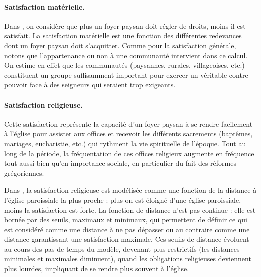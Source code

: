 \paragraph{Satisfaction matérielle.}

\begin{tcolorbox}[breakable,left=0pt,right=0pt,top=0pt,bottom=0pt,
	colback=gray!15,colframe=gray!15,width=\dimexpr\textwidth\relax, 
	enlarge left by=0mm, boxsep=5pt,arc=0pt,outer arc=0pt]
Dans \simfeodal{}, on considère que plus un foyer paysan doit régler de droits, moins il est satisfait.
La satisfaction matérielle est une fonction des différentes redevances dont un foyer paysan doit s'acquitter.
Comme pour la satisfaction générale, notons que l'appartenance ou non à une communauté intervient dans ce calcul.
On estime en effet que les communautés (paysannes, rurales, villageoises, etc.) constituent un groupe suffisamment important pour exercer un véritable contre-pouvoir face à des seigneurs qui seraient trop exigeants.
\end{tcolorbox}

\paragraph{Satisfaction religieuse.}
Cette satisfaction représente la capacité d'un foyer paysan à se rendre facilement à l'église pour assister aux offices et recevoir les différents sacrements (baptêmes, mariages, eucharistie, etc.) qui rythment la vie spirituelle de l'époque.
Tout au long de la période, la fréquentation de ces offices religieux augmente en fréquence tout aussi bien qu'en importance sociale, en particulier du fait des réformes grégoriennes.

\begin{tcolorbox}[breakable,left=0pt,right=0pt,top=0pt,bottom=0pt,
	colback=gray!15,colframe=gray!15,width=\dimexpr\textwidth\relax, 
	enlarge left by=0mm, boxsep=5pt,arc=0pt,outer arc=0pt]
Dans \simfeodal{}, la satisfaction religieuse est modélisée comme une fonction de la distance à l'église paroissiale la plus proche : plus on est éloigné d'une église paroissiale, moins la satisfaction est forte.
La fonction de distance n'est pas continue : elle est bornée par des seuils, maximaux et minimaux, qui permettent de définir ce qui est considéré comme une distance à ne pas dépasser ou au contraire comme une distance garantissant une satisfaction maximale.
Ces seuils de distance évoluent au cours des pas de temps du modèle, devenant plus restrictifs (les distances minimales et maximales diminuent), quand les obligations religieuses deviennent plus lourdes, impliquant de se rendre plus souvent à l'église.
\end{tcolorbox}

